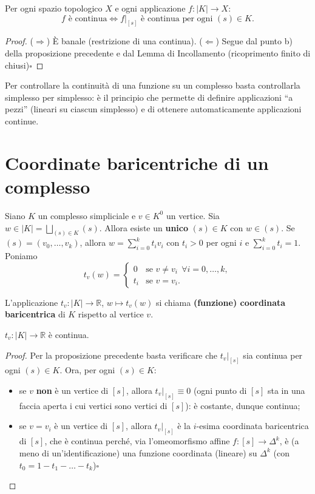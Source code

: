 \begin{prop}
Per ogni spazio topologico $X$ e ogni applicazione $f: |K| \to X$:
\[
f \text{ \`e continua} \iff f|_{[s]} \text{ \`e continua per ogni } (s) \in K.
\]
\end{prop}
\begin{proof}
($\Rightarrow$) \`E banale (restrizione di una continua). ($\Leftarrow$) Segue dal punto b) della proposizione precedente e dal Lemma di Incollamento (ricoprimento finito di chiusi)\hfill$\square$
\end{proof}

\begin{intuizione}
Per controllare la continuit\`a di una funzione su un complesso basta controllarla simplesso per simplesso: \`e il principio che permette di definire applicazioni ``a pezzi'' (lineari su ciascun simplesso) e di ottenere automaticamente applicazioni continue.
\end{intuizione}

\section{Coordinate baricentriche di un complesso}

Siano $K$ un complesso simpliciale e $v \in K^0$ un vertice. Sia $w \in |K| = \bigsqcup_{(s) \in K} (s)$. Allora esiste un \textbf{unico} $(s) \in K$ con $w \in (s)$. Se $(s) = (v_0, \dots, v_k)$, allora $w = \sum_{i=0}^k t_i v_i$ con $t_i > 0$ per ogni $i$ e $\sum_{i=0}^k t_i = 1$. Poniamo
\[
t_v(w) = \begin{cases} 0 & \text{se } v \neq v_i \ \ \forall i = 0, \dots, k, \\ t_i & \text{se } v = v_i. \end{cases}
\]

\begin{definicion}
L'applicazione $t_v: |K| \to \mathbb{R}$, $w \mapsto t_v(w)$ si chiama \textbf{(funzione) coordinata baricentrica} di $K$ rispetto al vertice $v$.
\end{definicion}

\begin{prop}
$t_v: |K| \to \mathbb{R}$ \`e continua.
\end{prop}
\begin{proof}
Per la proposizione precedente basta verificare che $t_v|_{[s]}$ sia continua per ogni $(s) \in K$. Ora, per ogni $(s) \in K$:
\begin{itemize}
    \item se $v$ \textbf{non} \`e un vertice di $[s]$, allora $t_v|_{[s]} \equiv 0$ (ogni punto di $[s]$ sta in una faccia aperta i cui vertici sono vertici di $[s]$): \`e costante, dunque continua;
    \item se $v = v_i$ \`e un vertice di $[s]$, allora $t_v|_{[s]}$ \`e la $i$-esima coordinata baricentrica di $[s]$, che \`e continua perch\'e, via l'omeomorfismo affine $f: [s] \to \Delta^k$, \`e (a meno di un'identificazione) una funzione coordinata (lineare) su $\Delta^k$ (con $t_0 = 1 - t_1 - \dots - t_k$)\hfill$\square$
\end{itemize}
\end{proof}

